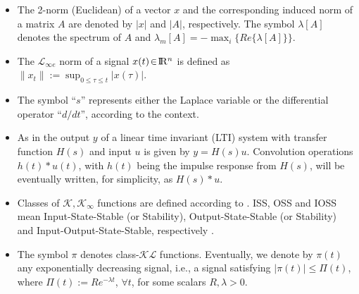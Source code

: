 \documentclass[letterpaper, 10 pt, conference]{ieeeconf}  %
\def\re{{\rm I}\! {\rm R}}
\theoremstyle{plain}
\theoremstyle{definition}
\theoremstyle{remark}
\begin{document}
\begin{itemize}

\item The 2-norm (Euclidean) of a vector $x$ and the corresponding
induced norm of a matrix $A$ are denoted by $|x|$ and $|A|$,
respectively. The symbol $\lambda[A]$ denotes the spectrum of $A$
and $\lambda_m[A]=-\max_i\{Re\{\lambda[A]\}\}$.


\item The ${\mathcal{L}}_{\infty e}$ norm of a signal
$x(t)\!\in\!\re^n$ is defined as
$\|x_{t}\|\!:=\!\sup_{0\!\leq\!\tau\!\leq\!t} |x(\tau)|$.


\item  The symbol  ``$s$'' represents either the
Laplace variable or the differential operator ``$d/dt$'', according
to the context. 

\item As in \cite{IS:96} the output $y$ of a linear time invariant (LTI) system with transfer function
$H(s)$ and input $u$ is given by $y=H(s)u$. Convolution operations $h(t)*u(t)$, with $h(t)$ being the impulse response from $H(s)$, will be eventually written, for simplicity, as $H(s)*u$.


\item Classes of $\mathcal{K}, \mathcal{K}_\infty$ functions are
defined according to \cite[p.~144]{K:02}. ISS, OSS and IOSS mean
Input-State-Stable (or Stability), Output-State-Stable (or
Stability) and Input-Output-State-Stable, respectively
\cite{SW:95}.


\item The symbol $\pi$ denotes class-$\mathcal{KL}$ functions. Eventually, we denote by $\pi (t)$ any exponentially decreasing signal, i.e., a signal satisfying $|\pi(t)| \leq \Pi(t)$, where $\Pi(t):=R e^{-\lambda t}$, $\forall t$, for  some scalars $R,\lambda>0$.
\end{itemize}

\end{document}

